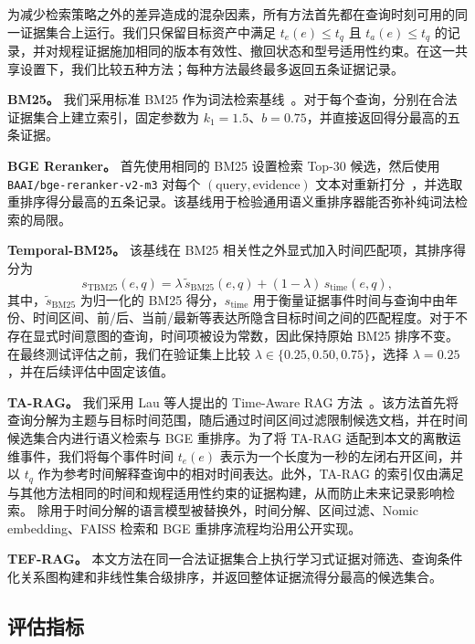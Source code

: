 为减少检索策略之外的差异造成的混杂因素，所有方法首先都在查询时刻可用的同一证据集合上运行。我们只保留目标资产中满足
$t_e(e)\le t_q$ 且 $t_a(e)\le t_q$ 的记录，并对规程证据施加相同的版本有效性、撤回状态和型号适用性约束。在这一共享设置下，我们比较五种方法；每种方法最终最多返回五条证据记录。

\textbf{BM25。}
我们采用标准 BM25 作为词法检索基线~\cite{robertson2009bm25}。对于每个查询，分别在合法证据集合上建立索引，固定参数为 $k_1=1.5$、$b=0.75$，并直接返回得分最高的五条证据。

\textbf{BGE Reranker。}
首先使用相同的 BM25 设置检索 Top-30 候选，然后使用 \texttt{BAAI/bge-reranker-v2-m3} 对每个 $(\text{query},\text{evidence})$ 文本对重新打分~\cite{chen2024bgem3,flagembedding2026reranker}，并选取重排序得分最高的五条记录。该基线用于检验通用语义重排序器能否弥补纯词法检索的局限。

\textbf{Temporal-BM25。}
该基线在 BM25 相关性之外显式加入时间匹配项，其排序得分为
\begin{equation}
s_{\mathrm{TBM25}}(e,q)
=
\lambda\,\widetilde{s}_{\mathrm{BM25}}(e,q)
+
(1-\lambda)\,s_{\mathrm{time}}(e,q),
\end{equation}
其中，$\widetilde{s}_{\mathrm{BM25}}$ 为归一化的 BM25 得分，$s_{\mathrm{time}}$ 用于衡量证据事件时间与查询中由年份、时间区间、前/后、当前/最新等表达所隐含目标时间之间的匹配程度。对于不存在显式时间意图的查询，时间项被设为常数，因此保持原始 BM25 排序不变。在最终测试评估之前，我们在验证集上比较 $\lambda\in\{0.25,0.50,0.75\}$，选择 $\lambda=0.25$，并在后续评估中固定该值。

\textbf{TA-RAG。}
我们采用 Lau 等人提出的 Time-Aware RAG 方法~\cite{lau2025tarag}。该方法首先将查询分解为主题与目标时间范围，随后通过时间区间过滤限制候选文档，并在时间候选集合内进行语义检索与 BGE 重排序。为了将 TA-RAG 适配到本文的离散运维事件，我们将每个事件时间 $t_e(e)$ 表示为一个长度为一秒的左闭右开区间，并以 $t_q$ 作为参考时间解释查询中的相对时间表达。此外，TA-RAG 的索引仅由满足与其他方法相同的时间和规程适用性约束的证据构建，从而防止未来记录影响检索。
除用于时间分解的语言模型被替换外，时间分解、区间过滤、Nomic embedding、FAISS 检索和 BGE 重排序流程均沿用公开实现。

\textbf{TEF-RAG。}
本文方法在同一合法证据集合上执行学习式证据对筛选、查询条件化关系图构建和非线性集合级排序，并返回整体证据流得分最高的候选集合。

\subsection{评估指标}
\label{sec:metrics}

